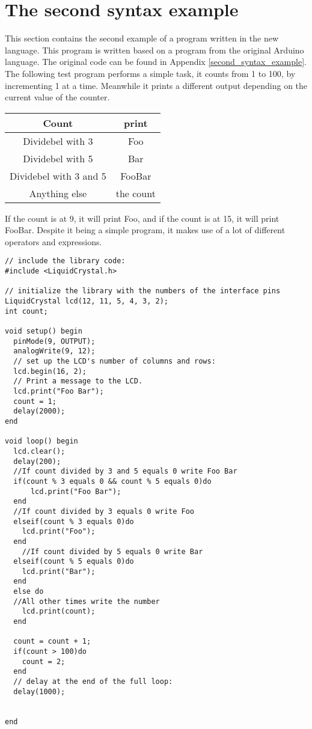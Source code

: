 \section{The second syntax example}
This section contains the second example of a program written in the new language. This program is written based on a program from the original Arduino language. The original code can be found in Appendix \ref{second_syntax_example}. The following test program performs a simple task,
it counts from 1 to 100, by incrementing 1 at a time. Meanwhile it prints a different output depending on the current value of the counter.\\
\begin{table}[H]
\centering
\begin{tabular}{|c|c|}
\hline 
Count & print \\ 
\hline 
Dividebel with 3 & Foo \\ 
\hline 
Dividebel with 5 & Bar \\ 
\hline 
Dividebel with 3 and 5 & FooBar \\ 
\hline 
Anything else & the count \\ 
\hline 
\end{tabular} 
\end{table}

If the count is at 9, it will print Foo, and if the count is at 15, it will print FooBar. Despite it being a simple program, it makes use of a lot of different operators and expressions.

\begin{lstlisting}[caption=LCD code example based on the source language, label=lst:syntax2]
// include the library code:
#include <LiquidCrystal.h>

// initialize the library with the numbers of the interface pins
LiquidCrystal lcd(12, 11, 5, 4, 3, 2);
int count;

void setup() begin
  pinMode(9, OUTPUT);
  analogWrite(9, 12);
  // set up the LCD's number of columns and rows: 
  lcd.begin(16, 2);
  // Print a message to the LCD.
  lcd.print("Foo Bar");
  count = 1;
  delay(2000);
end

void loop() begin
  lcd.clear();
  delay(200);
  //If count divided by 3 and 5 equals 0 write Foo Bar
  if(count % 3 equals 0 && count % 5 equals 0)do
      lcd.print("Foo Bar"); 
  end
  //If count divided by 3 equals 0 write Foo 
  elseif(count % 3 equals 0)do
    lcd.print("Foo");
  end
    //If count divided by 5 equals 0 write Bar 
  elseif(count % 5 equals 0)do
    lcd.print("Bar");
  end
  else do
  //All other times write the number
    lcd.print(count);
  end
  
  count = count + 1;
  if(count > 100)do
    count = 2;
  end
  // delay at the end of the full loop:
  delay(1000);


end
\end{lstlisting}

